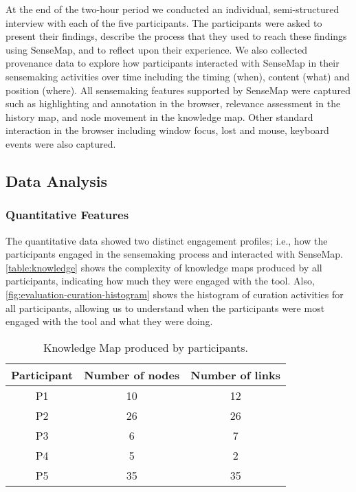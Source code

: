 At the end of the two-hour period we conducted an individual, semi-structured interview with each of the five participants. The participants were asked to present their findings, describe the process that they used to reach these findings using SenseMap, and to reflect upon their experience. We also collected provenance data to explore how participants interacted with SenseMap in their sensemaking activities over time including the timing (when), content (what) and position (where). All sensemaking features supported by SenseMap were captured such as highlighting and annotation in the browser, relevance assessment in the history map, and node movement in the knowledge map. Other standard interaction in the browser including window focus, lost and mouse, keyboard events were also captured.

\subsection{Data Analysis}

\subsubsection{Quantitative Features}
The quantitative data showed two distinct engagement profiles; i.e., how the participants engaged in the sensemaking process and interacted with SenseMap. \autoref{table:knowledge} shows the complexity of knowledge maps produced by all participants, indicating how much they were engaged with the tool. Also, \autoref{fig:evaluation-curation-histogram} shows the histogram of curation activities for all participants, allowing us to understand when the participants were most engaged with the tool and what they were doing.

\begin{table}[!htb]
	\centering
	\sffamily\small
	\caption{Knowledge Map produced by participants.}
	\label{table:knowledge}
	\begin{tabular}{ccc}
		\toprule
		\textbf{Participant} & \textbf{Number of nodes} & \textbf{Number of links} \\
		\midrule
		P1 & 10 & 12 \\
		P2 & 26 & 26 \\
		P3 & 6 & 7 \\
		P4 & 5 & 2 \\
		P5 & 35 & 35 \\
		\bottomrule
	\end{tabular}
\end{table}

